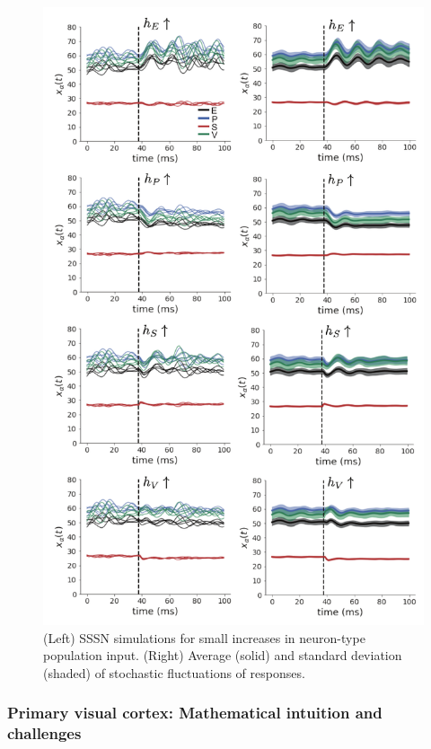 \documentclass[11pt]{article}
\begin{document}
\begin{figure}
\begin{center}
\includegraphics[scale=.8]{figures/figV1_1/figV1_1.pdf}
\end{center}
\caption{(Left) SSSN simulations for small increases in neuron-type population input.
(Right) Average (solid) and standard deviation (shaded) of stochastic fluctuations of responses.
 }
 \label{fig:V1_4}
\end{figure}

\subsubsection{Primary visual cortex: Mathematical intuition and challenges}\label{methods_V1_complexity}
\end{document}
